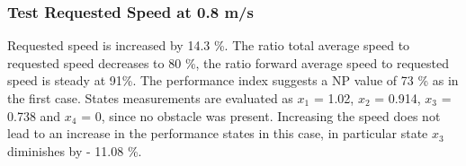 \subsubsection{Test Requested Speed at 0.8 m/s}
Requested speed is increased by 14.3 \%.
The ratio total average speed to requested speed decreases to 80 \%, the ratio forward average speed to requested speed is steady at 91\%. The performance index suggests a NP value of 73 \% as in the first case.
States measurements are evaluated as $x_1$ = 1.02, $x_2$ = 0.914, $x_3$ = 0.738 and $x_4$ = 0, since no obstacle was present. Increasing the speed does not lead to an increase in the performance states in this case, in particular state $x_3$ diminishes by - 11.08 \%.
\begin{table}[H]
\centering
{}
\end{table}
